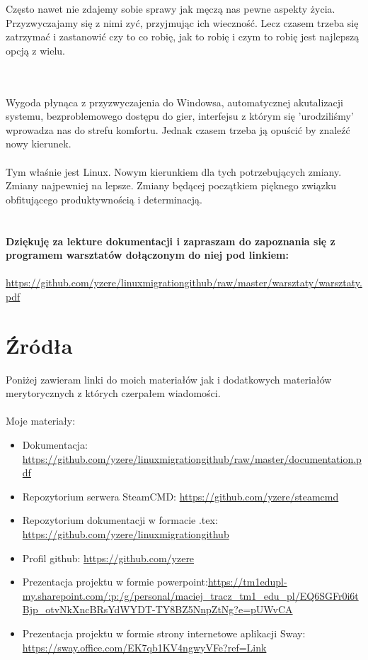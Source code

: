 \documentclass[10pt,a4paper]{report}
\begin{document}
Często nawet nie zdajemy sobie sprawy jak męczą nas pewne aspekty życia. Przyzwyczajamy się z nimi zyć, przyjmując ich wieczność. Lecz czasem trzeba się zatrzymać i zastanowić czy to co robię, jak to robię i czym to robię jest najlepszą opcją z wielu.\\\\ \

Wygoda płynąca z przyzwyczajenia do Windowsa, automatycznej akutalizacji systemu, bezproblemowego dostępu do gier, interfejsu z którym się 'urodziliśmy' wprowadza nas do strefu komfortu. Jednak czasem trzeba ją opuścić by znaleźć nowy kierunek.\\\\
Tym właśnie jest Linux. Nowym kierunkiem dla tych potrzebujących zmiany. Zmiany najpewniej na lepsze. Zmiany będącej początkiem pięknego związku obfitującego produktywnością i determinacją.\\\\\\

\textbf{Dziękuję za lekture dokumentacji i zapraszam do zapoznania się z programem warsztatów dołączonym do niej pod linkiem:}\\\\\url{https://github.com/yzere/linuxmigrationgithub/raw/master/warsztaty/warsztaty.pdf}
	
\newpage \newpage
\chapter{Źródła}
Poniżej zawieram linki do moich materiałów jak i dodatkowych materiałów merytorycznych z których czerpałem wiadomości.\\\\
Moje materiały:\\
\begin{itemize}
\item Dokumentacja: \url{https://github.com/yzere/linuxmigrationgithub/raw/master/documentation.pdf}
\item Repozytorium serwera SteamCMD: \url{https://github.com/yzere/steamcmd}
\item Repozytorium dokumentacji w formacie .tex: \url{https://github.com/yzere/linuxmigrationgithub}
\item Profil github: \url{https://github.com/yzere}
\item Prezentacja projektu w formie powerpoint:\url{https://tm1edupl-my.sharepoint.com/:p:/g/personal/maciej_tracz_tm1_edu_pl/EQ6SGFr0i6tBjp_otvNkXncBRsYdWYDT-TY8BZ5NnpZtNg?e=pUWvCA}
\item Prezentacja projektu w formie strony internetowe aplikacji Sway: \url{https://sway.office.com/EK7qb1KV4ngwyVFe?ref=Link}\\\\
\end{itemize}
\end{document}
